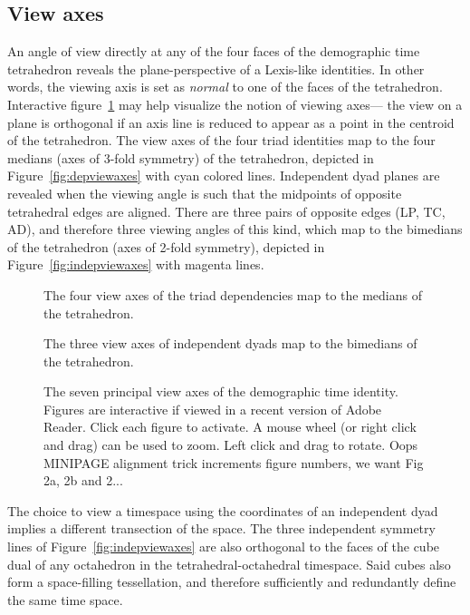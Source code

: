 \subsection{View axes}
An angle of view directly at any of the four faces of the demographic time tetrahedron reveals the plane-perspective of a Lexis-like identities. In other words, the viewing axis is set as \emph{normal} to one of the faces of the tetrahedron. Interactive figure~\ref{fig:viewaxes} may help visualize the notion of viewing axes--- the view on a plane is orthogonal if an axis line is reduced to appear as a point in the centroid of the tetrahedron. The view axes of the four triad identities map to the four medians (axes of 3-fold symmetry) of the tetrahedron, depicted in
Figure~\ref{fig:depviewaxes} with cyan colored lines. Independent dyad planes are revealed when the viewing angle is such that the midpoints of opposite tetrahedral edges are aligned. There are three pairs of opposite edges (LP, TC, AD), and therefore three viewing angles of this kind, which map to the bimedians of the tetrahedron (axes of 2-fold symmetry), depicted in Figure~\ref{fig:indepviewaxes} with magenta lines.

\begin{figure}
\centering
\begin{minipage}[t]{0.45\textwidth}

\caption{The four view axes of the triad dependencies map to the medians of the tetrahedron.}
\label{fig:depviewaxes}
\end{minipage}
\begin{minipage}[t]{0.45\textwidth}

\caption{The three view axes of independent dyads map to the bimedians of the
tetrahedron.}
\label{fig:indepviewaxes}
\end{minipage}
\caption{The seven principal view axes of the demographic time identity. Figures are interactive if viewed in a recent version of Adobe Reader. Click each figure to activate. A mouse wheel (or right click and drag) can be used to zoom. Left click and drag to rotate. Oops MINIPAGE alignment trick increments figure numbers, we want Fig 2a, 2b and 2...}
\label{fig:viewaxes}
\end{figure}

The choice to view a timespace using the coordinates of an independent dyad implies a different transection of the space. The three independent symmetry lines of Figure~\ref{fig:indepviewaxes} are also orthogonal to the faces of the cube dual of any octahedron in the tetrahedral-octahedral timespace. Said cubes also form a space-filling tessellation, and therefore sufficiently and redundantly define the same time space.

